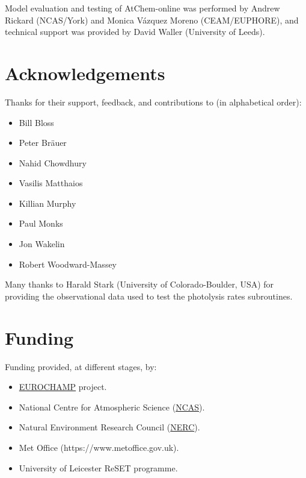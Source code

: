 Model evaluation and testing of AtChem-online was performed by Andrew
Rickard (NCAS/York) and Monica V{\'a}zquez Moreno (CEAM/EUPHORE), and
technical support was provided by David Waller (University of Leeds).

\section{Acknowledgements} \label{sec:acknowledgements}

Thanks for their support, feedback, and contributions to (in alphabetical order):

\begin{itemize}
\item Bill Bloss
\item Peter Br{\"a}uer
\item Nahid Chowdhury
\item Vasilis Matthaios
\item Killian Murphy
\item Paul Monks
\item Jon Wakelin
\item Robert Woodward-Massey
\end{itemize}

Many thanks to Harald Stark (University of Colorado-Boulder, USA) for providing
the observational data used to test the photolysis rates subroutines.

\section{Funding} \label{sec:funding}

Funding provided, at different stages, by:

\begin{itemize}
\item \href{https://www.eurochamp.org}{EUROCHAMP} project.
\item National Centre for Atmospheric Science (\href{https://www.ncas.ac.uk}{NCAS}).
\item Natural Environment Research Council (\href{https://nerc.ukri.org}{NERC}).
\item Met Office (https://www.metoffice.gov.uk).
\item University of Leicester ReSET programme.
\end{itemize}
